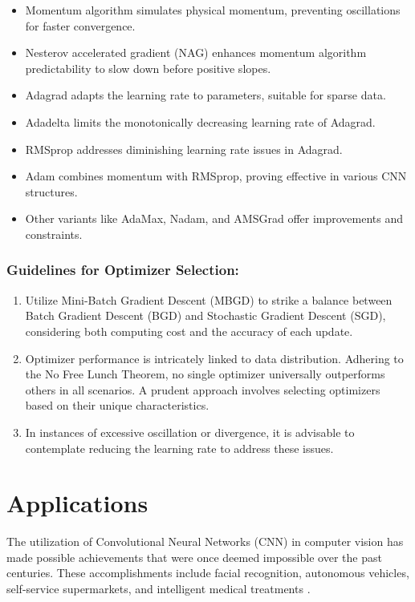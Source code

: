 \begin{itemize}
	\item Momentum algorithm simulates physical momentum, preventing oscillations for faster convergence.
	\item Nesterov accelerated gradient (NAG) enhances momentum algorithm predictability to slow down before positive slopes.
	\item Adagrad adapts the learning rate to parameters, suitable for sparse data.
	\item Adadelta limits the monotonically decreasing learning rate of Adagrad.
	\item RMSprop addresses diminishing learning rate issues in Adagrad.
	\item Adam combines momentum with RMSprop, proving effective in various CNN structures.
	\item Other variants like AdaMax, Nadam, and AMSGrad offer improvements and constraints.
\end{itemize}

\subsubsection{Guidelines for Optimizer Selection:}

\begin{enumerate}
	\item Utilize Mini-Batch Gradient Descent (MBGD) to strike a balance between Batch Gradient Descent (BGD) and Stochastic Gradient Descent (SGD), considering both computing cost and the accuracy of each update.
	
	\item Optimizer performance is intricately linked to data distribution. Adhering to the No Free Lunch Theorem, no single optimizer universally outperforms others in all scenarios. A prudent approach involves selecting optimizers based on their unique characteristics.
	
	\item In instances of excessive oscillation or divergence, it is advisable to contemplate reducing the learning rate to address these issues.
\end{enumerate}

\section{Applications}

The utilization of Convolutional Neural Networks (CNN) in computer vision has made possible achievements that were once deemed impossible over the past centuries. These accomplishments include facial recognition, autonomous vehicles, self-service supermarkets, and intelligent medical treatments \cite{Li:2021}.

